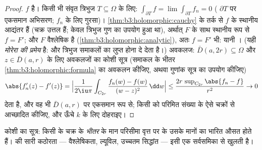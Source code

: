 \begin{proof}
$f$  है। किसी भी संवृत त्रिभुज $T \subseteq
\Omega$ के लिए: $\int_{\partial T}f = \lim\int_{\partial T}f_n = 0$ (
$\partial T$ पर एकसमान अभिसरण; $f_n$ के लिए गुरसा)। \cref{thm:b3:holomorphic:cauchy} के तर्क से
$f$ के स्थानीय आद्यंतर हैं (चक्र उत्तल हैं; केवल त्रिभुज गुण का
उपयोग हुआ था), अर्थात्  $F$ के साथ स्थानीय रूप से
$f = F'$; और $F$ वैश्लेषिक है (\cref{thm:b3:holomorphic:analytic}), अतः $f = F'$ भी: यानी
। (यही \emph{मोरेरा की प्रमेय}
है:  और त्रिभुज समाकलों का लुप्त होना  दे देता
है।) अवकलज: $\bar D(a, 2r) \subseteq \Omega$ और $z \in \bar D(a, r)$ के लिए अवकलजों का कोशी सूत्र (समाकल के
भीतर \cref{thm:b3:holomorphic:formula} का अवकलन कीजिए, अथवा गुणांक सूत्र का उपयोग कीजिए)
\[
\abs{f_n'(z) - f'(z)} =
\Bigl|\frac{1}{2\iu\pi}\int_{C_{2r}}\frac{f_n(w) - f(w)}{(w -
z)^2}\,\dd w\Bigr|
\leq \frac{2r\,\sup_{C_{2r}}\abs{f_n - f}}{r^2} \to 0
\]
देता है, और वह भी $\bar D(a,r)$ पर एकसमान रूप से; किसी  को परिमित
संख्या के ऐसे चक्रों से आच्छादित कीजिए, और ऊँचे $k$ के लिए
दोहराइए।
\end{proof}

\begin{omfigure}

{\small कोशी का सूत्र: किसी  के चक्र के
\emph{भीतर} के मान परिसीमा वृत्त पर के उसके मानों का भारित औसत
होते हैं।  की सारी कठोरता --- वैश्लेषिकता, ल्यूविल,
उच्चतम सिद्धांत --- इसी एक सर्वसमिका से खुलती है।}
\end{omfigure}

